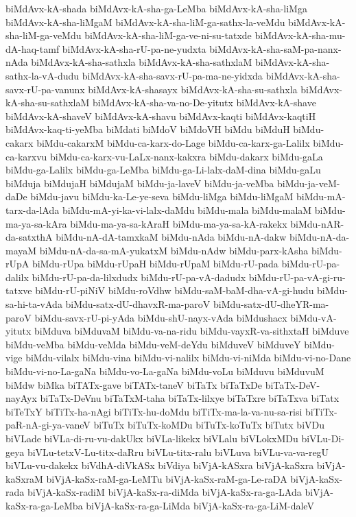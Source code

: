 {biMdAvx-kA-shada
biMdAvx-kA-sha-ga-LeMba
biMdAvx-kA-sha-liMga
biMdAvx-kA-sha-liMgaM
biMdAvx-kA-sha-liM-ga-sathx-la-veMdu
biMdAvx-kA-sha-liM-ga-veMdu
biMdAvx-kA-sha-liM-ga-ve-ni-su-tatxde
biMdAvx-kA-sha-mu-dA-haq-tamf
biMdAvx-kA-sha-rU-pa-ne-yudxta
biMdAvx-kA-sha-saM-pa-nanx-nAda
biMdAvx-kA-sha-sathxla
biMdAvx-kA-sha-sathxlaM
biMdAvx-kA-sha-sathx-la-vA-dudu
biMdAvx-kA-sha-savx-rU-pa-ma-ne-yidxda
biMdAvx-kA-sha-savx-rU-pa-vanunx
biMdAvx-kA-shasayx
biMdAvx-kA-sha-su-sathxla
biMdAvx-kA-sha-su-sathxlaM
biMdAvx-kA-sha-va-no-De-yitutx
biMdAvx-kA-shave
biMdAvx-kA-shaveV
biMdAvx-kA-shavu
biMdAvx-kaqti
biMdAvx-kaqtiH
biMdAvx-kaq-ti-yeMba
biMdati
biMdoV
biMdoVH
biMdu
biMduH
biMdu-cakarx
biMdu-cakarxM
biMdu-ca-karx-do-Lage
biMdu-ca-karx-ga-Lalilx
biMdu-ca-karxvu
biMdu-ca-karx-vu-LaLx-nanx-kakxra
biMdu-dakarx
biMdu-gaLa
biMdu-ga-Lalilx
biMdu-ga-LeMba
biMdu-ga-Li-lalx-daM-dina
biMdu-gaLu
biMduja
biMdujaH
biMdujaM
biMdu-ja-laveV
biMdu-ja-veMba
biMdu-ja-veM-daDe
biMdu-javu
biMdu-ka-Le-ye-seva
biMdu-liMga
biMdu-liMgaM
biMdu-mA-tarx-da-lAda
biMdu-mA-yi-ka-vi-lalx-daMdu
biMdu-mala
biMdu-malaM
biMdu-ma-ya-sa-kAra
biMdu-ma-ya-sa-kAraH
biMdu-ma-ya-sa-kA-rakekx
biMdu-nAR-da-satxthA
biMdu-nA-dA-tamxkaM
biMdu-nAda
biMdu-nA-dakw
biMdu-nA-da-mayaM
biMdu-nA-da-sa-mA-yukatxM
biMdu-nAdw
biMdu-parx-kAsha
biMdu-rUpA
biMdu-rUpa
biMdu-rUpaH
biMdu-rUpaM
biMdu-rU-pada
biMdu-rU-pa-dalilx
biMdu-rU-pa-da-lilxdudx
biMdu-rU-pa-vA-dadudx
biMdu-rU-pa-vA-gi-ru-tatxve
biMdu-rU-piNiV
biMdu-roVdhw
biMdu-saM-baM-dha-vA-gi-hudu
biMdu-sa-hi-ta-vAda
biMdu-satx-dU-dhavxR-ma-paroV
biMdu-satx-dU-dheYR-ma-paroV
biMdu-savx-rU-pi-yAda
biMdu-shU-nayx-vAda
biMdushacx
biMdu-vA-yitutx
biMduva
biMduvaM
biMdu-va-na-ridu
biMdu-vayxR-va-sithxtaH
biMduve
biMdu-veMba
biMdu-veMda
biMdu-veM-deYdu
biMduveV
biMduveY
biMdu-vige
biMdu-vilalx
biMdu-vina
biMdu-vi-nalilx
biMdu-vi-niMda
biMdu-vi-no-Dane
biMdu-vi-no-La-gaNa
biMdu-vo-La-gaNa
biMdu-voLu
biMduvu
biMduvuM
biMdw
biMka
biTATx-gave
biTATx-taneV
biTaTx
biTaTxDe
biTaTx-DeV-nayAyx
biTaTx-DeVnu
biTaTxM-taha
biTaTx-lilxye
biTaTxre
biTaTxva
biTatx
biTeTxY
biTiTx-ha-nAgi
biTiTx-hu-doMdu
biTiTx-ma-la-va-nu-sa-risi
biTiTx-paR-nA-gi-ya-vaneV
biTuTx
biTuTx-koMDu
biTuTx-koTuTx
biTutx
biVDu
biVLade
biVLa-di-ru-vu-dakUkx
biVLa-likekx
biVLalu
biVLokxMDu
biVLu-Di-geya
biVLu-tetxV-Lu-titx-daRru
biVLu-titx-ralu
biVLuva
biVLu-va-va-regU
biVLu-vu-dakekx
biVdhA-diVkASx
biVdiya
biVjA-kASxra
biVjA-kaSxra
biVjA-kaSxraM
biVjA-kaSx-raM-ga-LeMTu
biVjA-kaSx-raM-ga-Le-raDA
biVjA-kaSx-rada
biVjA-kaSx-radiM
biVjA-kaSx-ra-diMda
biVjA-kaSx-ra-ga-LAda
biVjA-kaSx-ra-ga-LeMba
biVjA-kaSx-ra-ga-LiMda
biVjA-kaSx-ra-ga-LiM-daleV
}
